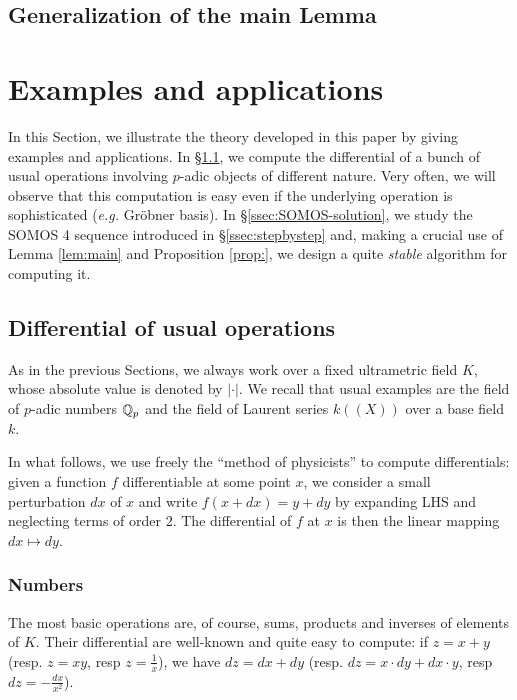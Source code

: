 \documentclass{amsart}
\begin{document}
\subsection{Generalization of the main Lemma}


\section{Examples and applications}

In this Section, we illustrate the theory developed in this paper by 
giving examples and applications. In \S \ref{ssec:differentials}, we 
compute the differential of a bunch of usual operations involving 
$p$-adic objects of different nature. Very often, we will observe that 
this computation is easy even if the underlying operation is 
sophisticated (\emph{e.g.} Gr\"obner basis).
In \S \ref{ssec:SOMOS-solution}, we study the SOMOS 4 sequence 
introduced in \S \ref{ssec:stepbystep} and, making a crucial use of 
Lemma \ref{lem:main} and Proposition \ref{prop:}, we design a quite 
\emph{stable} algorithm for computing it.

\subsection{Differential of usual operations}
\label{ssec:differentials}

As in the previous Sections, we always work over a fixed ultrametric 
field $K$, whose absolute value is denoted by $|\cdot|$. We recall that 
usual examples are the field of $p$-adic numbers $\mathbb Q_p$ and the field of 
Laurent series $k((X))$ over a base field $k$.

In what follows, we use freely the ``method of physicists'' to compute 
differentials: given a function $f$ differentiable at some point $x$, we 
consider a small perturbation $dx$ of $x$ and write $f(x+dx) = y + dy$ 
by expanding LHS and neglecting terms of order $2$. The differential of 
$f$ at $x$ is then the linear mapping $dx \mapsto dy$.

\subsubsection*{Numbers}

The most basic operations are, of course, sums, products and inverses of 
elements of $K$. Their differential are well-known and quite easy to 
compute: if $z = x + y$ (resp. $z = xy$, resp $z = \frac 1 x$), we have 
$dz = dx + dy$ (resp. $dz = x \cdot dy + dx \cdot y$, resp $dz = - 
\frac{dx}{x^2}$).
\end{document}
